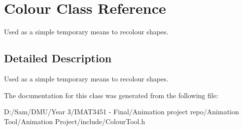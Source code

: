 \hypertarget{class_colour}{}\section{Colour Class Reference}
\label{class_colour}


Used as a simple temporary means to recolour shapes.  




\subsection{Detailed Description}
Used as a simple temporary means to recolour shapes. 

The documentation for this class was generated from the following file\+:\begin{DoxyCompactItemize}
\item 
D\+:/\+Sam/\+D\+M\+U/\+Year 3/\+I\+M\+A\+T3451 -\/ Final/\+Animation project repo/\+Animation Tool/\+Animation Project/include/Colour\+Tool.\+h\end{DoxyCompactItemize}
